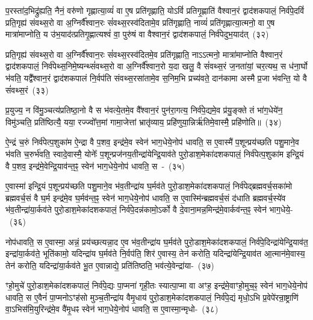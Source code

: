 प॒रस्ता॑द॒भिद्रु॑ह्यति॒ नैनं॒ वरु॑णो गृह्णात्या॒व्यं॑ वा ए॒ष प्रति॑गृह्णाति॒ यो\-ऽविं॑ प्रतिगृ॒ह्णाति॑ वैश्वान॒रं द्वाद॑श\-कपालं॒ निर्व॑पे॒दविं॑ प्रति॒गृह्य॑ संवथ्स॒रो वा अ॒ग्निर्वै᳚श्वान॒रः सं॑वथ्स॒रस्व॑दितामे॒व प्रति॑गृह्णाति॒ नाव्यं॑ प्रति॑\-गृह्णात्या॒त्मनो॒ वा ए॒ष मात्रा॑माप्नोति॒ य उ॑भ॒याद॑त्प्रतिगृ॒ह्णात्यश्वं॑ वा॒ पुरु॑षं वा वैश्वान॒रं द्वाद॑श\-कपालं॒ निर्व॑पेदुभ॒याद॑त्~(३२)\ip

प्रति॒गृह्य॑ संवथ्स॒रो वा अ॒ग्निर्वै᳚श्वान॒रः सं॑वथ्स॒रस्व॑दितमे॒व प्रति॑गृह्णाति॒ ना\-ऽऽ\-त्मनो॒ मात्रा॑माप्नोति वैश्वान॒रं द्वाद॑श\-कपालं॒ निर्व॑पेथ्स॒निमे॒ष्यन्थ्सं॑वथ्स॒रो वा अ॒ग्निर्वै᳚श्वान॒रो य॒दा खलु॒ वै सं॑वथ्स॒रं ज॒नता॑यां॒ चर॒त्यथ॒ स ध॑ना॒र्घो भ॑वति॒ यद्वै᳚श्वान॒रं द्वाद॑श\-कपालं नि॒र्वप॑ति संवथ्स॒रसा॑तामे॒व स॒निम॒भि प्रच्य॑वते॒ दान॑कामा अस्मै प्र॒जा भ॑वन्ति॒ यो वै सं॑वथ्स॒रं~(३३)\ip

प्र॒युज्य॒ न वि॑मु॒ञ्चत्य॑प्रतिष्ठा॒नो वै स भ॑वत्ये॒तमे॒व वै᳚श्वान॒रं पुन॑रा॒गत्य॒ निर्व॑पे॒द्यमे॒व प्र॑यु॒ङ्क्ते तं भा॑ग॒धेये॑न॒ विमु॑ञ्चति॒ प्रति॑ष्ठित्यै॒ यया॒ रज्ज्वो᳚त्त॒मां गामा॒जेत्तां भ्रातृ॑व्याय॒ प्रहि॑णुया॒न्निर्\mbox{}ऋ॑तिमे॒वास्मै॒ प्रहि॑णोति॥~(३४)\ip

{\anuvakamend[{नि॒र्व॒रु॒णं व॑पेदुभ॒याद॒द्यो वै सं॑वथ्स॒रꣳ षट्त्रिꣳ॑शच्च।}]}

ऐ॒न्द्रं च॒रुं निर्व॑पेत्प॒शुका॑म ऐ॒न्द्रा वै प॒शव॒ इन्द्र॑मे॒व स्वेन॑ भाग॒\-धेये॒नोप॑ धावति॒ स ए॒वास्मै॑ प॒शून्प्रय॑च्छति पशु॒माने॒व भ॑वति च॒रुर्भ॑वति॒ स्वादे॒वास्मै॒ योनेः᳚ प॒शून्प्रज॑नय॒तीन्द्रा॑येन्द्रि॒याव॑ते पुरो॒डाश॒मेका॑\-दश\-कपालं॒ निर्व॑पेत्प॒शुका॑म इन्द्रि॒यं वै प॒शव॒ इन्द्र॑मे॒वेन्द्रि॒याव॑न्त॒ꣴ॒ स्वेन॑ भाग॒\-धेये॒नोप॑ धावति॒ स~-~(३५)\ip

ए॒वास्मा॑ इन्द्रि॒यं प॒शून्प्रय॑च्छति पशु॒माने॒व भ॑व॒तीन्द्रा॑य घ॒र्मव॑ते पुरो॒डाश॒मेका॑\-दश\-कपालं॒ निर्व॑पेद्ब्रह्मवर्च॒सका॑मो ब्रह्मवर्च॒सं वै घ॒र्म इन्द्र॑मे॒व घ॒र्मव॑न्त॒ꣴ॒ स्वेन॑ भाग॒\-धेये॒नोप॑ धावति॒ स ए॒वास्मि॑न्ब्रह्मवर्च॒सं द॑धाति ब्रह्मवर्च॒स्ये॑व भ॑व॒तीन्द्रा॑या॒र्कव॑ते पुरो॒डाश॒मेका॑\-दश\-कपालं॒ निर्व॑पे॒दन्न॑कामो॒\-ऽर्को वै दे॒वाना॒मन्न॒मिन्द्र॑मे॒वार्कव॑न्त॒ꣴ॒ स्वेन॑ भाग॒\-धेये॒-~(३६)\ip

नोप॑धावति॒ स ए॒वास्मा॒ अन्नं॒ प्रय॑च्छत्यन्ना॒द ए॒व भ॑व॒तीन्द्रा॑य घ॒र्मव॑ते पुरो॒डाश॒मेका॑\-दश\-कपालं॒ निर्व॑पे॒दिन्द्रा॑येन्द्रि॒याव॑त॒ इन्द्रा॑\-या॒र्कव॑ते॒ भूति॑कामो॒ यदिन्द्रा॑य घ॒र्मव॑ते नि॒र्वप॑ति॒ शिर॑ ए॒वास्य॒ तेन॑ करोति॒ यदिन्द्रा॑येन्द्रि॒याव॑त आ॒त्मान॑मे॒वास्य॒ तेन॑ करोति॒ यदिन्द्रा॑या॒र्कव॑ते भू॒त ए॒वान्नाद्ये॒ प्रति॑तिष्ठति॒ भव॑त्ये॒वेन्द्रा॑या-~(३७)\ip

ꣳहो॒मुचे॑ पुरो॒डाश॒मेका॑\-दश\-कपालं॒ निर्व॑पे॒द्यः पा॒प्मना॑ गृही॒तः स्यात्पा॒प्मा वा अꣳह॒ इन्द्र॑मे॒वाꣳहो॒मुच॒ꣴ॒ स्वेन॑ भाग॒\-धेये॒नोप॑ धावति॒ स ए॒वैनं॑ पा॒प्मनो\-ऽꣳह॑सो मुञ्च॒तीन्द्रा॑य वैमृ॒धाय॑ पुरो॒डाश॒मेका॑\-दश\-कपालं॒ निर्व॑पे॒द्यं मृधो॒\-ऽभि प्र॒वेपे॑रन्रा॒ष्ट्राणि॑ वा॒\-ऽभिस॑मि॒युरिन्द्र॑मे॒व वै॑मृ॒धꣴ स्वेन॑ भाग॒\-धेये॒नोप॑ धावति॒ स ए॒वास्मा॒न्मृधो-~(३८)\ip

